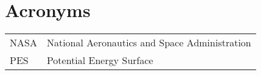 \section{Acronyms}
\label{sec:Acronyms}

\begin{longtable*}[l]{l @{\qquad} l}
NASA        &  National Aeronautics and Space Administration               \\
PES         &  Potential Energy Surface
\end{longtable*}
